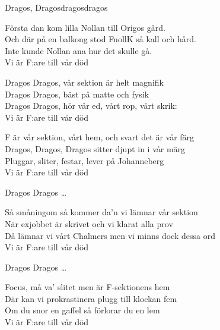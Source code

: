 \begin{song}{Dragos, Dragos}{dragosdragos}

\begin{vers}
Första dan kom lilla Nollan till Origos gård.\\ 
Och där på en balkong stod FnollK så kall och hård.\\
Inte kunde Nollan ana hur det skulle gå.\\
Vi är F:are till vår död \\
\end{vers}

\begin{vers}
Dragos Dragos, vår sektion är helt magnifik \\
Dragos Dragos, bäst på matte och fysik \\
Dragos Dragos, hör vår ed, vårt rop, vårt skrik:\\
Vi är F:are till vår död \\
\end{vers}

\begin{vers}
F är vår sektion, vårt hem, och svart det är vår färg\\
Dragos, Dragos, Dragos sitter djupt in i vår märg\\
Pluggar, sliter, festar, lever på Johanneberg\\
Vi är F:are till vår död\\
\end{vers}

\begin{vers}
Dragos Dragos \ldots
\end{vers}

\begin{vers}
Så småningom så kommer da'n vi lämnar vår sektion\\
När exjobbet är skrivet och vi klarat alla prov\\
Då lämnar vi vårt Chalmers men vi minns dock dessa ord\\
Vi är F:are till vår död\\
\end{vers}

\begin{vers}
Dragos Dragos \ldots
\end{vers}
\end{song}

\iffalse

\begin{vers}
Focus, må va' slitet men är F-sektionens hem \\
Där kan vi prokrastinera plugg till klockan fem\\
Om du snor en gaffel så förlorar du en lem \\
Vi är F:are till vår död\\
\end{vers}

